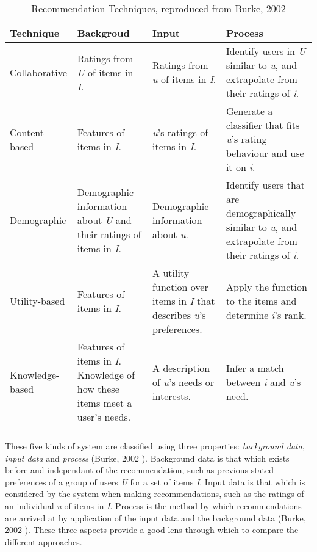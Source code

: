 \begin{table}[ht]
    \caption{Recommendation Techniques, reproduced from Burke, 2002 \cite{Burke02}}
    \centering
    \begin{tabular}{p{2.5cm} p{3.5cm} p{3.5cm} p{3.5cm}}
        Technique & Backgroud & Input & Process
        \\\hline\hline
        Collaborative & Ratings from \textit{U} of items in \textit{I}. & Ratings from \textit{u} of items in \textit{I}. & Identify users in \textit{U} similar to \textit{u}, and extrapolate from their ratings of \textit{i}. \\
        Content-based & Features of items in \textit{I}. & \textit{u}'s ratings of items in \textit{I}. & Generate a classifier that fits \textit{u}'s rating behaviour and use it on \textit{i}. \\ 
        Demographic & Demographic information about \textit{U} and their ratings of items in \textit{I}. & Demographic information about \textit{u}. & Identify users that are demographically similar to \textit{u}, and extrapolate from their ratings of \textit{i}. \\
        Utility-based & Features of items in \textit{I}. & A utility function over items in \textit{I} that describes \textit{u}'s preferences. & Apply the function to the items and determine \textit{i}'s rank. \\
        Knowledge-based & Features of items in \textit{I}. Knowledge of how these items meet a user's needs. & A description of \textit{u}'s needs or interests. & Infer a match between \textit{i} and \textit{u}'s need. \\
        \\\hline
    \end{tabular}
    \label{table:burke02}
\end{table}

These five kinds of system are classified using three properties: \textit{background data}, \textit{input data} and \textit{process} (Burke, 2002 \cite{Burke02}). Background data is that which exists before and independant of the recommendation, such as previous stated preferences of a group of users \textit{U} for a set of items \textit{I}. Input data is that which is considered by the system when making recommendations, such as the ratings of an individual \textit{u} of items in \textit{I}. Process is the method by which recommendations are arrived at by application of the input data and the background data (Burke, 2002 \cite{Burke02}). These three aspects provide a good lens through which to compare the different approaches.

